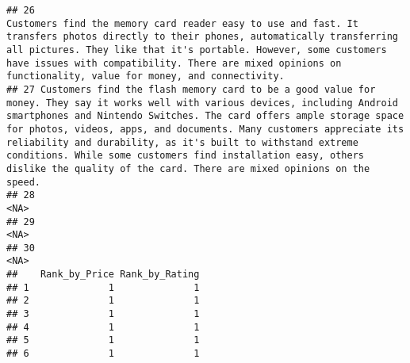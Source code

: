 \documentclass[
]{article}
\begin{document}
\begin{verbatim}
## 26                                                                                                                                                                 Customers find the memory card reader easy to use and fast. It transfers photos directly to their phones, automatically transferring all pictures. They like that it's portable. However, some customers have issues with compatibility. There are mixed opinions on functionality, value for money, and connectivity.
## 27 Customers find the flash memory card to be a good value for money. They say it works well with various devices, including Android smartphones and Nintendo Switches. The card offers ample storage space for photos, videos, apps, and documents. Many customers appreciate its reliability and durability, as it's built to withstand extreme conditions. While some customers find installation easy, others dislike the quality of the card. There are mixed opinions on the speed.
## 28                                                                                                                                                                                                                                                                                                                                                                                                                                                                                   <NA>
## 29                                                                                                                                                                                                                                                                                                                                                                                                                                                                                   <NA>
## 30                                                                                                                                                                                                                                                                                                                                                                                                                                                                                   <NA>
##    Rank_by_Price Rank_by_Rating
## 1              1              1
## 2              1              1
## 3              1              1
## 4              1              1
## 5              1              1
## 6              1              1

\end{verbatim}
\end{document}

